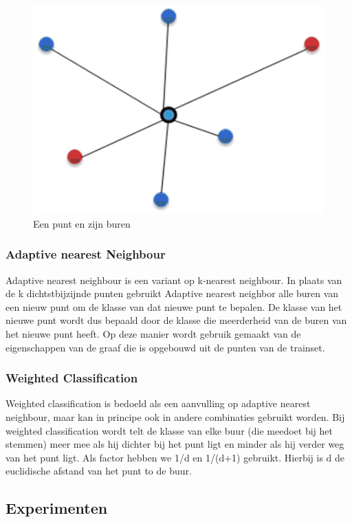 \documentclass{article}
\begin{document}
\begin{figure}[!h]
    \centering
        \includegraphics[scale=0.4, page=1]{buren}
	\caption{Een punt en zijn buren}
    \label{buren}
\end{figure}

\subsubsection{Adaptive nearest Neighbour}
Adaptive nearest neighbour is een variant op k-nearest neighbour. In plaats van de k dichtstbijzijnde punten gebruikt Adaptive nearest neighbor alle buren van een nieuw punt om de klasse van dat nieuwe punt te bepalen. De klasse van het nieuwe punt wordt dus bepaald door de klasse die meerderheid van de buren van het nieuwe punt heeft. Op deze manier wordt gebruik gemaakt van de eigenschappen van de graaf die is opgebouwd uit de punten van de trainset. 

\subsubsection{Weighted Classification}
Weighted classification is bedoeld als een aanvulling op adaptive nearest neighbour, maar kan in principe ook in andere combinaties gebruikt worden. Bij weighted classification wordt telt de klasse van elke buur (die meedoet bij het stemmen) meer mee als hij dichter bij het punt ligt en minder als hij verder weg van het punt ligt. Als factor hebben we 1/d en 1/(d+1) gebruikt. Hierbij is d de euclidische afstand van het punt to de buur.

\subsection{Experimenten}
\end{document}
